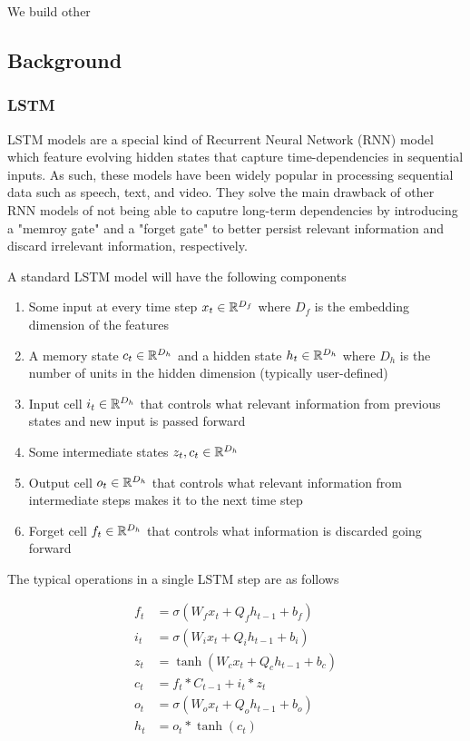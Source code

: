 We build other 

\subsection{Background}

\subsubsection{LSTM}


LSTM models are a special kind of Recurrent Neural Network (RNN) model which feature evolving hidden states that capture time-dependencies in sequential inputs. As such, these models have been widely popular in processing sequential data such as speech, text, and video. They solve the main drawback of other RNN models of not being able to caputre long-term dependencies by introducing a "memroy gate" and a "forget gate" to better persist relevant information and discard irrelevant information, respectively. 

A standard LSTM model will have the following components

\begin{enumerate}
	\item Some input at every time step $x_t \in \mathbb{R}^{D_f}$ where $D_f$ is the embedding dimension of the features
	\item A memory state $c_t \in \mathbb{R}^{D_h}$ and a hidden state $h_t \in \mathbb{R}^{D_h}$ where $D_h$ is the number of units in the hidden dimension (typically user-defined)
	\item Input cell $i_t \in \mathbb{R}^{D_h}$ that controls what relevant information from previous states and new input is passed forward
	\item Some intermediate states $z_t, c_t \in \mathbb{R}^{D_h}$
	\item Output cell $o_t \in \mathbb{R}^{D_h}$ that controls what relevant information from intermediate steps makes it to the next time step
	\item Forget cell $f_t \in \mathbb{R}^{D_h}$ that controls what information is discarded going forward
\end{enumerate}

The typical operations in a single LSTM step are as follows

\begin{align*}
f_t & = \sigma(W_fx_t + Q_fh_{t-1} + b_f) \\
i_t & = \sigma(W_ix_t + Q_ih_{t-1} + b_i) \\
z_t & = \tanh(W_cx_t + Q_ch_{t-1} + b_c) \\
c_t & = f_t * C_{t-1} + i_t * z_t \\
o_t & = \sigma(W_ox_t + Q_oh_{t-1} + b_o) \\
h_t & = o_t * \tanh(c_t)
\end{align*}

